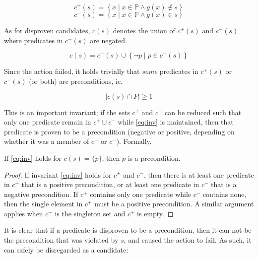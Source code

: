 \documentclass[../../Master.tex]{subfiles}
\begin{document}
\begin{equation} \label{eq:cPlus}
    c^+(s) = \left\{ x \; | \; x \in \mathbb{P} \land g(x) \notin s \right\}
\end{equation}
\begin{equation} \label{eq:cMinus}
    c^-(s) = \left\{ x \; | \; x \in \mathbb{P} \land g(x) \in s \right\}
\end{equation}

As for disproven candidates, $c(s)$ denotes the union of $c^+(s)$ and $c^-(s)$ where predicates in $c^-(s)$ are negated.

\begin{equation}
    c(s) = c^+(s) \cup \left\{ \neg p \; | \; p \in c^-(s) \right\}
\end{equation}

Since the action failed, it holds trivially that \textit{some} predicates in $c^+(s)$ or $c^-(s)$ (or both) are preconditions, ie.

\begin{equation} \label{eq:inv}
    \left| c(s) \cap P \right| \geq 1
\end{equation}

This is an important invariant; if the sets $c^+$ and $c^-$ can be reduced such that only one predicate remain in $c^+ \cup c^-$ while \eqref{eq:inv} is maintained, then that predicate is proven to be a precondition (negative or positive, depending on whether it was a member of $c^+$ or $c^-$). Formally,

\begin{proposition} \label{prop:ncp:precond-holds}
    If \eqref{eq:inv} holds for $c(s) = \{p\}$, then $p$ is a precondition.
\end{proposition}

\begin{proof}
    If invariant \eqref{eq:inv} holds for $c^+$ and $c^-$, then there is at least one predicate in $c^+$ that is a positive precondition, or at least one predicate in $c^-$ that is a negative precondition. If $c^+$ contains only one predicate while $c^-$ contains none, then the single element in $c^+$ must be a positive precondition. A similar argument applies when $c^-$ is the singleton set and $c^+$ is empty.
\end{proof}

It is clear that if a predicate is disproven to be a precondition, then it can not be the precondition that was violated by $s$, and caused the action to fail. As such, it can safely be disregarded as a candidate:
\end{document}
